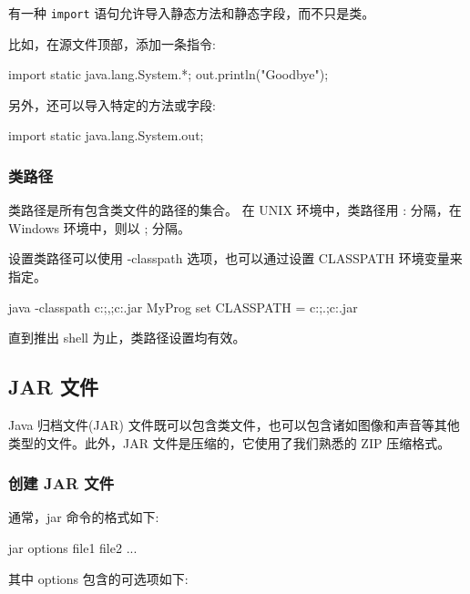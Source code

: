 有一种 \texttt{import} 语句允许导入静态方法和静态字段，而不只是类。

比如，在源文件顶部，添加一条指令:
\begin{Java}
import static java.lang.System.*;
out.println("Goodbye");
\end{Java}

另外，还可以导入特定的方法或字段:
\begin{Java}
import static java.lang.System.out;
\end{Java}

\subsubsection{类路径}

类路径是所有包含类文件的路径的集合。
在 UNIX 环境中，类路径用 : 分隔，在 Windows 环境中，则以 ; 分隔。

设置类路径可以使用 -classpath 选项，也可以通过设置 CLASSPATH 环境变量来指定。

\begin{Java}
java -classpath c:\classdir;,;c:\archives\archive.jar MyProg
set CLASSPATH = c:\classdir;.;c:\archives\archive.jar
\end{Java}

直到推出 shell 为止，类路径设置均有效。

\subsection{JAR 文件}

Java 归档文件(JAR) 文件既可以包含类文件，也可以包含诸如图像和声音等其他类型的文件。此外，JAR 文件是压缩的，它使用了我们熟悉的 ZIP 压缩格式。

\subsubsection{创建 JAR 文件}

通常，jar 命令的格式如下:
\begin{Java}
jar options file1 file2 ...
\end{Java}

其中 options 包含的可选项如下:

